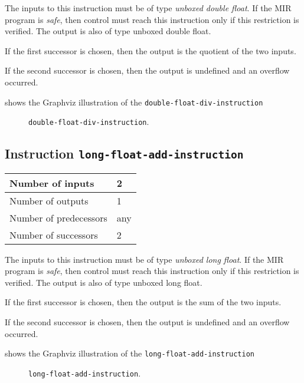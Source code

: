 The inputs to this instruction must be of type \emph{unboxed double
  float}.  If the MIR program is \emph{safe}, then control must reach
this instruction only if this restriction is verified.  The output is
also of type unboxed double float.

If the first successor is chosen, then the output is
the quotient of the two inputs.  

If the second successor is chosen, then the output is undefined and an
overflow occurred. 

 shows the Graphviz illustration of the
\texttt{double-float-div-instruction}

\begin{figure}
\begin{center}
\end{center}
\caption{\label{fig-double-float-div-instruction}
\texttt{double-float-div-instruction}.}
\end{figure}

\subsection{Instruction \texttt{long-float-add-instruction}}
\label{mir-instruction-long-float-add}

\begin{tabular}{|l|l|}
\hline
Number of inputs & 2\\
\hline
Number of outputs & 1\\
\hline
Number of predecessors & any\\
\hline
Number of successors & 2\\
\hline
\end{tabular}

The inputs to this instruction must be of type \emph{unboxed long
  float}.  If the MIR program is \emph{safe}, then control must reach
this instruction only if this restriction is verified.  The output is
also of type unboxed long float.

If the first successor is chosen, then the output is
the sum of the two inputs.  

If the second successor is chosen, then the output is undefined and an
overflow occurred. 

 shows the Graphviz illustration of the
\texttt{long-float-add-instruction}

\begin{figure}
\begin{center}
\end{center}
\caption{\label{fig-long-float-add-instruction}
\texttt{long-float-add-instruction}.}
\end{figure}

